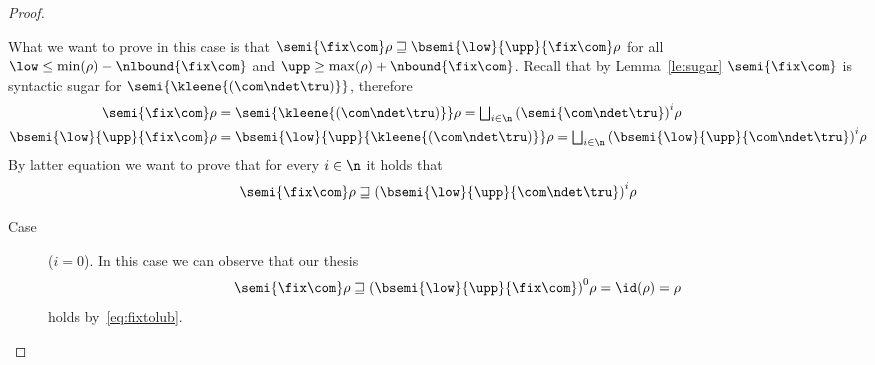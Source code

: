 \begin{proof}
\begin{inductive}
    \case{\(\fix{\com}\)} What we want to prove in this case is that
    \(\semi{\fix\com}\rho \sqsupseteq
    \bsemi{\low}{\upp}{\fix\com}\rho\) for all
    \(\low \leq \min(\rho) - \nlbound{\fix\com}\) and
    \(\upp \geq \max(\rho) + \nbound{\fix\com}\). Recall that by
    Lemma~\ref{le:sugar} \(\semi{\fix\com}\) is syntactic sugar
    for \(\semi{\kleene{(\com \ndet \tru)}}\), therefore
    \begin{align}
      \semi{\fix\com}\rho & =
      \semi{\kleene{(\com\ndet\tru)}}\rho =
      \textstyle\bigsqcup_{i\in\n}{\left(\semi{\com\ndet\tru}\right)}^i\rho \label{eq:fixtolub}\\
      \bsemi{\low}{\upp}{\fix\com}\rho & =
      \bsemi{\low}{\upp}{\kleene{(\com\ndet\tru)}}\rho =
      \textstyle\bigsqcup_{i\in\n}{\left(\bsemi{\low}{\upp}{\com\ndet\tru}\right)}^i\rho \label{eq:fixtolubk}
    \end{align}
    By latter equation we want to prove that for every \(i\in\n\) it
    holds that
    \begin{equation}
      \semi{\fix\com}\rho \sqsupseteq {\left(\bsemi{\low}{\upp}{\com\ndet\tru}\right)}^i\rho
    \end{equation}
    \begin{description}
    \item[Case] (\(i=0\)). In this case we can observe that our thesis
      \begin{equation*}
        \semi{\fix\com}\rho \sqsupseteq {\left(\bsemi{\low}{\upp}{\fix\com}\right)}^0\rho = \id(\rho) = \rho
      \end{equation*}
      holds by~\eqref{eq:fixtolub}.
      

\end{description}
\end{inductive}
\end{proof}
